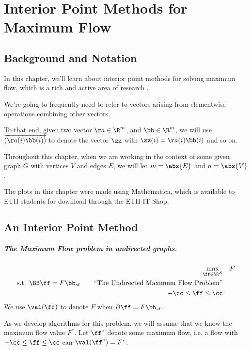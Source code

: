 \chapter{Interior Point Methods for Maximum Flow}

\newcommand{\sdiv}{\tilde{D}}
\newcommand\cvec[1]{\overrightarrow{\left(#1\right)}}

\section*{Background and Notation}

In this chapter, we'll learn about interior point methods for solving
maximum flow, which is a rich and active area of research \cite{DS08,M13,LS20a,LS20b}. 

We're going to frequently need to refer to vectors
arising from elementwise operations combining other vectors.

To that end, given two vector $\aa \in \R^m$, and $\bb \in \R^m$, we
will use $\cvec{\aa(i) \bb(i)}$ to denote the vector $\zz$ with
$\zz(i) = \aa(i) \bb(i)$ and so on.

Throughout this chapter, when we are working in the context of some
given graph $G$ with vertices $V$ and edges $E$, we will let $m =
\abs{E}$ and $n = \abs{V}$.

The plots in this chapter were made using Mathematica, which is
available to ETH students for download through the ETH IT Shop.


\section{An Interior Point Method}
\paragraph{The Maximum Flow problem in undirected graphs.}
 \begin{align}
   \label{eq:maxflowagain}
\max_{\ff \in \R^E}  & \quad F    \\
   \textrm{s.t. }  \BB\ff= F \bb_{st}
     \tag*{``The Undirected Maximum Flow Problem''}
   \\
   \nonumber 
   -\cc \leq \ff \leq \cc
\end{align}
We use $\val(\ff)$ to denote $F$ when $B\ff = F\bb_{st}$.

As we develop algorithms for this problem, we will assume that we know
the maximum flow value $F^*$.
Let $\ff^*$ denote some maximum flow, i.e. a flow with $-\cc \leq \ff
\leq \cc$ can $\val(\ff^*) = F^*$.

